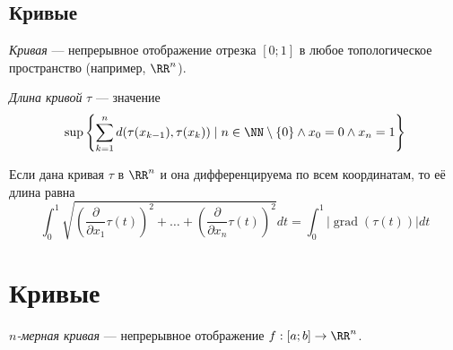 \documentclass[12pt,a4paper]{article}
\DeclareMathOperator{\grad}{grad}
\begin{document}

    \subsection{Кривые}

    \begin{definition}
        \emph{Кривая} --- непрерывное отображение отрезка $[0; 1]$ в любое топологическое пространство (например, $\RR^n$). 
    \end{definition}


    \begin{definition}
        \emph{Длина кривой} $\tau$ --- значение
        \[\sup \left\{\sum_{k=1}^n d(\tau(x_{k-1}), \tau(x_k)) \mid n \in \NN \setminus \{0\} \wedge x_0 = 0 \wedge x_n = 1\right\}\]
    \end{definition}

    \begin{statement}
        Если дана кривая $\tau$ в $\RR^n$ и она дифференцируема по всем координатам, то её длина равна
        \[
            \int_0^1 \sqrt{\left(\frac{\partial}{\partial x_1} \tau(t)\right)^2 + \dots + \left(\frac{\partial}{\partial x_n} \tau(t)\right)^2} dt
            = \int_0^1 |\grad(\tau(t))| dt
        \]
    \end{statement}

    \section{Кривые}

    \begin{definition}
        \emph{$n$-мерная кривая} --- непрерывное отображение $f: [a; b] \to \RR^n$.
    \end{definition}
\end{document}
